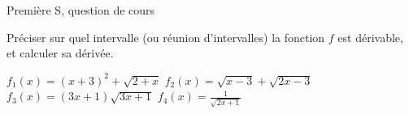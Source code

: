 Première S, question de cours

Préciser sur quel intervalle (ou réunion d'intervalles) la fonction $f$ est dérivable, et calculer sa dérivée.
\begin{enumerate}
  \li $f_1(x) = (x + 3)^2 + \sqrt{2+x}$
  \li $f_2(x) = \sqrt{x - 3} + \sqrt{2x - 3}$
  \li $f_3(x) = (3x + 1)\sqrt{3x + 1}$
  \li $f_4(x) = \frac{1}{\sqrt{2x + 1}}$
\end{enumerate}